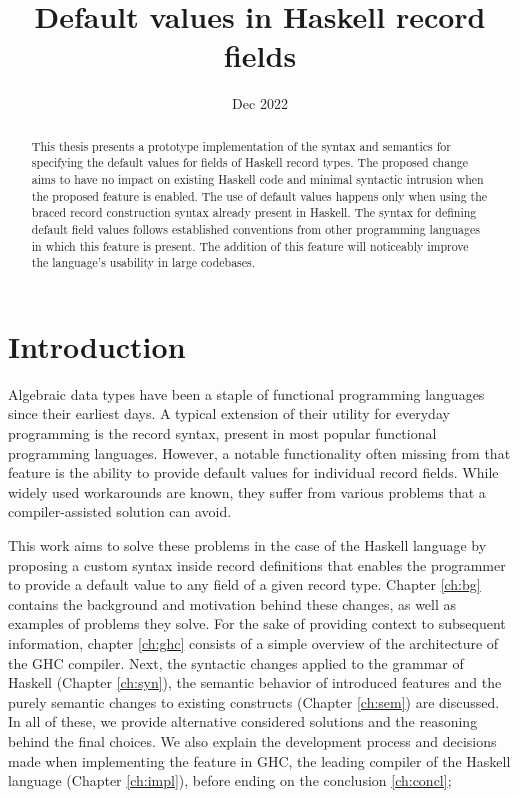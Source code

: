 \documentclass[en]{pracamgr}
\title{Default values in Haskell record fields}
\date{Dec 2022}
\begin{document}
\maketitle

\begin{abstract}
This thesis presents a prototype implementation of the syntax and semantics for specifying
the default values for fields of Haskell record types. The proposed change aims to have no 
impact on existing Haskell code and minimal syntactic intrusion when the proposed feature 
is enabled. The use of default values happens only when using the braced record construction syntax 
already present in Haskell. The syntax for defining default field values follows established
conventions from other programming languages in which this feature is present. The addition
of this feature will noticeably improve the language's usability in large codebases.
\end{abstract}

\tableofcontents

\chapter*{Introduction}

Algebraic data types have been a staple of functional programming languages since their earliest days.
A typical extension of their utility for everyday programming is the record syntax, present in most popular functional programming languages.
However, a notable functionality often missing from that feature is the ability to provide default values for individual record fields.
While widely used workarounds are known, they suffer from various problems that a compiler-assisted solution can avoid.

This work aims to solve these problems in the case of the Haskell language \cite{HudakHaskell}
by proposing a custom syntax inside record definitions that enables the programmer to provide a default value to any field of a given record type.
Chapter \ref*{ch:bg} contains the background and motivation behind these changes, as well as examples of problems they solve.
For the sake of providing context to subsequent information, chapter \ref*{ch:ghc}
consists of a simple overview of the architecture of the GHC compiler.
Next, the syntactic changes applied to the grammar of Haskell (Chapter \ref*{ch:syn}), 
the semantic behavior of introduced features 
and the purely semantic changes to existing constructs (Chapter \ref*{ch:sem}) are discussed.
In all of these, we provide alternative considered solutions and the reasoning behind the final choices.
We also explain the development process and decisions made when implementing the feature in GHC, 
the leading compiler of the Haskell language (Chapter \ref*{ch:impl}),
before ending on the conclusion \ref*{ch:concl};
\end{document}
